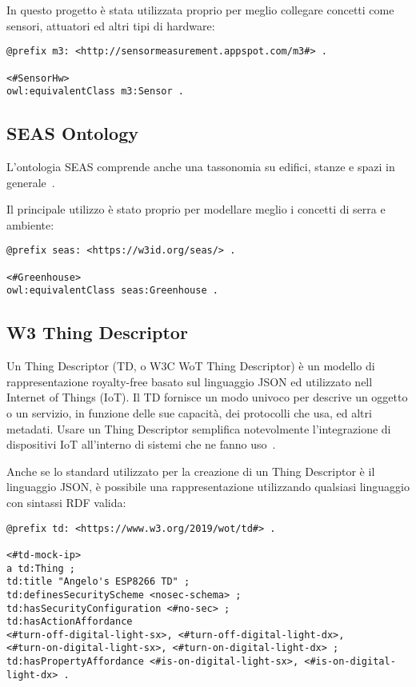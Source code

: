 \noindent In questo progetto è stata utilizzata proprio per meglio collegare concetti come sensori, attuatori ed altri tipi di hardware:

\begin{verbatim}
@prefix m3: <http://sensormeasurement.appspot.com/m3#> .

<#SensorHw>
owl:equivalentClass m3:Sensor .
\end{verbatim}

\subsection{SEAS Ontology}
L'ontologia SEAS comprende anche una tassonomia su edifici, stanze e spazi in generale~\cite{SEAS:online}.

\noindent Il principale utilizzo è stato proprio per modellare meglio i concetti di serra e ambiente:

\begin{verbatim}
@prefix seas: <https://w3id.org/seas/> .

<#Greenhouse>
owl:equivalentClass seas:Greenhouse .
\end{verbatim}

\subsection{W3 Thing Descriptor}
Un Thing Descriptor (TD, o W3C WoT Thing Descriptor) è un modello di rappresentazione royalty-free basato sul linguaggio JSON ed utilizzato nell Internet of Things (IoT). Il TD fornisce un modo univoco per descrive un oggetto o un servizio, in funzione delle sue capacità, dei protocolli che usa, ed altri metadati. Usare un Thing Descriptor semplifica notevolmente l’integrazione di dispositivi IoT all’interno di sistemi che ne fanno uso~\cite{ThingDes54:online}.

\noindent Anche se lo standard utilizzato per la creazione di un Thing Descriptor è il linguaggio JSON, è possibile una rappresentazione utilizzando qualsiasi linguaggio con sintassi RDF valida:
\begin{verbatim}
@prefix td: <https://www.w3.org/2019/wot/td#> .

<#td-mock-ip>
a td:Thing ;
td:title "Angelo's ESP8266 TD" ;
td:definesSecurityScheme <nosec-schema> ;
td:hasSecurityConfiguration <#no-sec> ;
td:hasActionAffordance
<#turn-off-digital-light-sx>, <#turn-off-digital-light-dx>,
<#turn-on-digital-light-sx>, <#turn-on-digital-light-dx> ;
td:hasPropertyAffordance <#is-on-digital-light-sx>, <#is-on-digital-light-dx> .
\end{verbatim}
